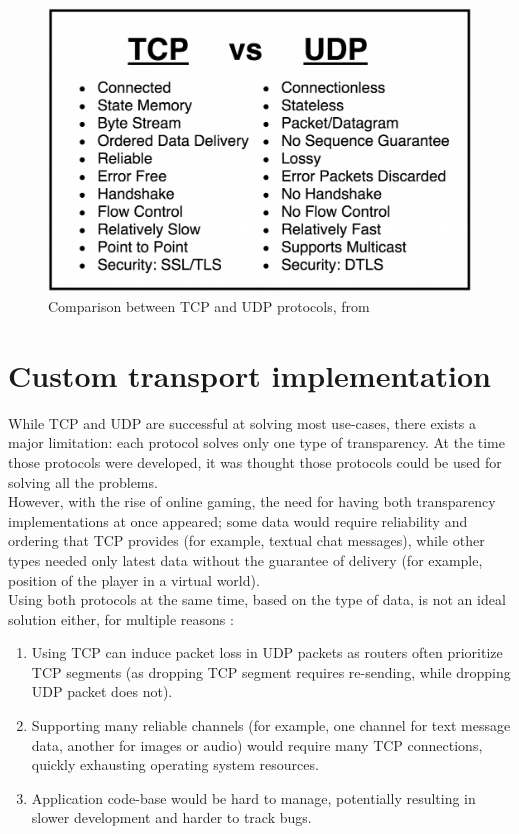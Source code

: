\documentclass[times, utf8, diplomski]{fer}
\begin{document}
\begin{figure}[H]
	\centering
	\includegraphics[scale=0.45]{TCP-vs-UDP}
	\caption{Comparison between TCP and UDP protocols, from \cite{NetBurner:TCP-vs-UDP}}
	\label{fig:tcp-vs-udp}
\end{figure}


\section{Custom transport implementation}
While TCP and UDP are successful at solving most use-cases, there exists a major limitation: each protocol solves only one type of transparency. At the time those protocols were developed, it was thought those protocols could be used for solving all the problems. \\

However, with the rise of online gaming, the need for having both transparency implementations at once appeared; some data would require reliability and ordering that TCP provides (for example, textual chat messages), while other types needed only latest data without the guarantee of delivery (for example, position of the player in a virtual world). \\

Using both protocols at the same time, based on the type of data, is not an ideal solution either, for multiple reasons \cite{GafferOnGames:UDP-vs-TCP}:

\begin{enumerate}
	\item Using TCP can induce packet loss in UDP packets as routers often prioritize TCP segments (as dropping TCP segment requires re-sending, while dropping UDP packet does not).
	\item Supporting many reliable channels (for example, one channel for text message data, another for images or audio) would require many TCP connections, quickly exhausting operating system resources.
	\item Application code-base would be hard to manage, potentially resulting in slower development and harder to track bugs.
\end{enumerate}
\end{document}

